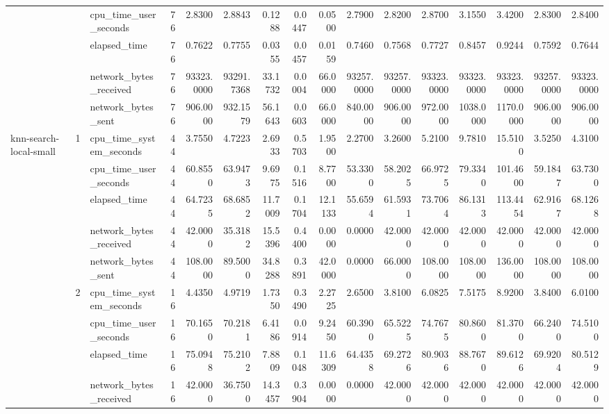 \begin{tabular}{lllrrrrrrrrrrrrr}
 &  & cpu\_time\_user\_seconds & 76 & 2.8300 & 2.8843 & 0.1288 & 0.0447 & 0.0500 & 2.7900 & 2.8200 & 2.8700 & 3.1550 & 3.4200 & 2.8300 & 2.8400 \\
 &  & elapsed\_time & 76 & 0.7622 & 0.7755 & 0.0355 & 0.0457 & 0.0159 & 0.7460 & 0.7568 & 0.7727 & 0.8457 & 0.9244 & 0.7592 & 0.7644 \\
 &  & network\_bytes\_received & 76 & 93323.0000 & 93291.7368 & 33.1732 & 0.0004 & 66.0000 & 93257.0000 & 93257.0000 & 93323.0000 & 93323.0000 & 93323.0000 & 93257.0000 & 93323.0000 \\
 &  & network\_bytes\_sent & 76 & 906.0000 & 932.1579 & 56.1643 & 0.0603 & 66.0000 & 840.0000 & 906.0000 & 972.0000 & 1038.0000 & 1170.0000 & 906.0000 & 906.0000 \\
\cline{1-16} \cline{2-16}
\multirow[t]{15}{*}{knn-search-local-small} & \multirow[t]{5}{*}{1} & cpu\_time\_system\_seconds & 44 & 3.7550 & 4.7223 & 2.6933 & 0.5703 & 1.9500 & 2.2700 & 3.2600 & 5.2100 & 9.7810 & 15.5100 & 3.5250 & 4.3100 \\
 &  & cpu\_time\_user\_seconds & 44 & 60.8550 & 63.9473 & 9.6975 & 0.1516 & 8.7700 & 53.3300 & 58.2025 & 66.9725 & 79.3340 & 101.4600 & 59.1847 & 63.7300 \\
 &  & elapsed\_time & 44 & 64.7235 & 68.6852 & 11.7009 & 0.1704 & 12.1133 & 55.6594 & 61.5931 & 73.7064 & 86.1313 & 113.4454 & 62.9167 & 68.1268 \\
 &  & network\_bytes\_received & 44 & 42.0000 & 35.3182 & 15.5396 & 0.4400 & 0.0000 & 0.0000 & 42.0000 & 42.0000 & 42.0000 & 42.0000 & 42.0000 & 42.0000 \\
 &  & network\_bytes\_sent & 44 & 108.0000 & 89.5000 & 34.8288 & 0.3891 & 42.0000 & 0.0000 & 66.0000 & 108.0000 & 108.0000 & 136.0000 & 108.0000 & 108.0000 \\
\cline{2-16}
 & \multirow[t]{5}{*}{2} & cpu\_time\_system\_seconds & 16 & 4.4350 & 4.9719 & 1.7350 & 0.3490 & 2.2725 & 2.6500 & 3.8100 & 6.0825 & 7.5175 & 8.9200 & 3.8400 & 6.0100 \\
 &  & cpu\_time\_user\_seconds & 16 & 70.1650 & 70.2181 & 6.4186 & 0.0914 & 9.2450 & 60.3900 & 65.5225 & 74.7675 & 80.8600 & 81.3700 & 66.2400 & 74.5100 \\
 &  & elapsed\_time & 16 & 75.0948 & 75.2102 & 7.8809 & 0.1048 & 11.6309 & 64.4358 & 69.2726 & 80.9036 & 88.7670 & 89.6126 & 69.9204 & 80.5129 \\
 &  & network\_bytes\_received & 16 & 42.0000 & 36.7500 & 14.3457 & 0.3904 & 0.0000 & 0.0000 & 42.0000 & 42.0000 & 42.0000 & 42.0000 & 42.0000 & 42.0000 \\

\end{tabular}

